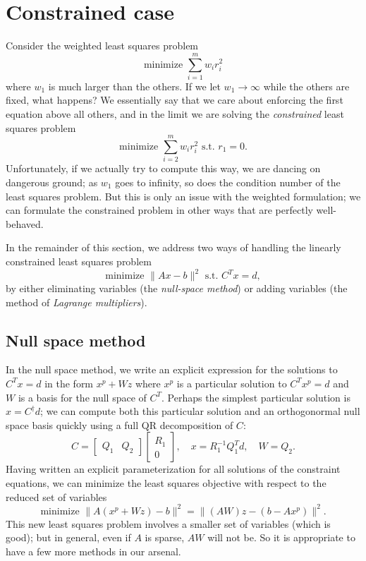 \section{Constrained case}

Consider the weighted least squares problem
\[
  \mbox{minimize } \sum_{i=1}^m w_i r_i^2
\]
where $w_1$ is much larger than the others.  If we
let $w_1 \rightarrow \infty$ while the others are fixed, what happens?
We essentially say that we care about enforcing the first equation
above all others, and in the limit we are solving the {\em constrained}
least squares problem
\[
  \mbox{minimize } \sum_{i=2}^m w_i r_i^2 \mbox{ s.t. } r_1 = 0.
\]
Unfortunately, if we actually try to compute this way, we are dancing on
dangerous ground; as $w_1$ goes to infinity, so does the condition
number of the least squares problem.  But this is only an issue with the
weighted formulation; we can formulate the constrained problem in other
ways that are perfectly well-behaved.

In the remainder of this section, we address two ways of handling
the linearly constrained least squares problem
\[
  \mbox{minimize } \|Ax-b\|^2 \mbox{ s.t. } C^T x = d,
\]
by either eliminating variables (the {\em null-space method}) or adding
variables (the method of {\em Lagrange multipliers}).

\subsection{Null space method}

In the null space method, we write an explicit expression for the solutions
to $C^T x = d$ in the form $x^p + W z$ where $x^p$ is a particular solution
to $C^T x^p = d$ and $W$ is a basis for the null space of $C^T$.  Perhaps the
simplest particular solution is $x = C^\dagger d$; we can compute both
this particular solution and an orthogonormal null space basis quickly
using a full QR decomposition of $C$:
\[
  C =
    \begin{bmatrix} Q_1 & Q_2 \end{bmatrix}
    \begin{bmatrix} R_1 \\ 0 \end{bmatrix}, \quad
  x = R_1^{-1} Q_1^T d, \quad W = Q_2.
\]
Having written an explicit parameterization for all solutions of the
constraint equations, we can minimize the least squares objective with
respect to the reduced set of variables
\[
  \mbox{minimize } \|A(x^p + Wz) - b\|^2 = \|(AW)z - (b-Ax^p)\|^2.
\]
This new least squares problem involves a smaller set of variables
(which is good); but in general, even if $A$ is sparse, $AW$ will not be.
So it is appropriate to have a few more methods in our arsenal.


